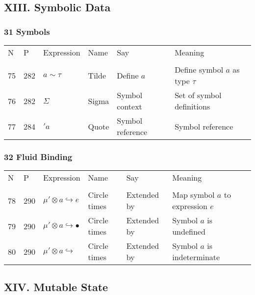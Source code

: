 \documentclass[12pt]{article}
\begin{document}
\subsection*{XIII. Symbolic Data}
\subsubsection*{31 Symbols}
\begin{tabular}[b] {p{} p{} p{} p{} 
p{} p{}}
N & P & Expression & Name & Say & Meaning \\ \\

75 & 282 & $a \sim \tau$ & Tilde & Define $a$ & Define symbol $a$ as type $\tau$ \\
76 & 282 & $\Sigma$ & Sigma & Symbol context & Set of symbol definitions \\
77 & 284 & $'a$ & Quote & Symbol reference & Symbol reference \\
\end{tabular}

\subsubsection*{32 Fluid Binding}
\begin{tabular}[b] {p{} p{} p{} p{} 
p{} p{}}
N & P & Expression & Name & Say & Meaning \\ \\
78 & 290 & $\mu ' \otimes a \hookrightarrow e$ & Circle times & Extended by &  Map symbol $a$ to expression $e$\\
79 & 290 & $\mu ' \otimes a \hookrightarrow \bullet$ & Circle times & Extended by &  Symbol $a$ is undefined\\
80 & 290 & $\mu ' \otimes a \hookrightarrow $ \underline{ } & Circle times & Extended by &  Symbol $a$ is indeterminate\\

\end{tabular}

\subsection*{XIV. Mutable State}
\end{document}
